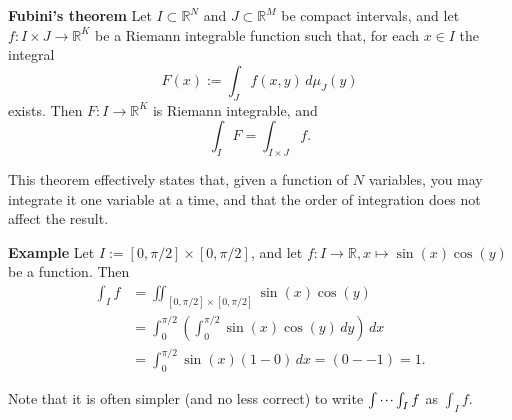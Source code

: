 \documentclass[12pt]{article}
\newcommand{\R}{\mathbb{R}}
\begin{document}

\textbf{Fubini's theorem}
Let $I \subset \R^N$ and $J \subset \R^M$ be compact intervals, and let $f : I \times J \to \R^K$ be a Riemann integrable function such that, for each $x \in I$ the integral
\[
F(x) := \int_J f(x, y)\, d\mu_J(y)
\]
exists. Then $F:I\to\R^K$ is Riemann integrable, and
\[
\int_I F = \int_{I\times J} f.
\]

This theorem effectively states that, given a function of $N$ variables, you may integrate it one variable at a time, and that the order of integration does not affect the result.

\textbf{Example} Let $I := [0, \pi/2]\times[0,\pi/2]$, and let $f : I \to \R, x \mapsto \sin(x)\cos(y)$ be a function.
Then
\begin{equation*}
\begin{split}
\int_I f &= \iint_{[0, \pi/2]\times[0,\pi/2]} \sin(x)\cos(y) \\
&=\int_0^{\pi/2} \left( \int_0^{\pi/2} \sin(x)\cos(y)\,dy\right)\,dx \\
&=\int_0^{\pi/2} \sin(x)\left(1 - 0\right)\,dx =(0 - -1) = 1.
\end{split}
\end{equation*}

Note that it is often simpler (and no less correct) to write $\idotsint_I f$ as $\int_I f$.
\end{document}
